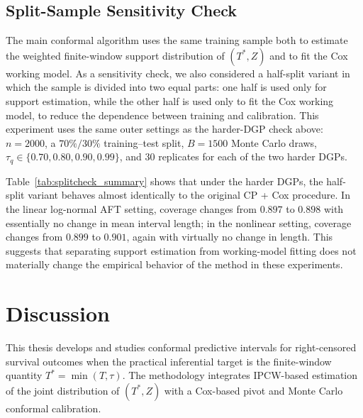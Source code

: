 \documentclass[12pt]{article}
\makeatletter
\let\thesis@chapter\section
\let\thesis@section\subsection
\let\thesis@subsection\subsubsection
\newcommand{\chapter}{\thesis@chapter}
\renewcommand{\section}{\thesis@section}
\renewcommand{\subsection}{\thesis@subsection}
\makeatother
\begin{document}
\section{\texorpdfstring{\textcolor{revisionblue}{Split-Sample Sensitivity Check}}{Split-Sample Sensitivity Check}}
{\color{revisionblue}
The main conformal algorithm uses the same training sample both to estimate the weighted finite-window support distribution of $(T^*,Z)$ and to fit the Cox working model. As a sensitivity check, we also considered a half-split variant in which the sample is divided into two equal parts: one half is used only for support estimation, while the other half is used only to fit the Cox working model, to reduce the dependence between training and calibration. This experiment uses the same outer settings as the harder-DGP check above: $n=2000$, a $70\%/30\%$ training--test split, $B=1500$ Monte Carlo draws, $\tau_q\in\{0.70,0.80,0.90,0.99\}$, and $30$ replicates for each of the two harder DGPs.

\begin{table}[htbp]
\centering
\small
\caption{\textcolor{revisionblue}{Average coverage and mean interval length for the original CP + Cox method and the half-split variant, aggregated over $\tau$ within each harder DGP.}}
\label{tab:splitcheck_summary}
%
\end{table}

Table~\ref{tab:splitcheck_summary} shows that under the harder DGPs, the half-split variant behaves almost identically to the original CP + Cox procedure. In the linear log-normal AFT setting, coverage changes from $0.897$ to $0.898$ with essentially no change in mean interval length; in the nonlinear setting, coverage changes from $0.899$ to $0.901$, again with virtually no change in length. This suggests that separating support estimation from working-model fitting does not materially change the empirical behavior of the method in these experiments.
}



\chapter{Discussion}
This thesis develops and studies conformal predictive intervals for right-censored survival outcomes when the practical inferential target is the finite-window quantity $T^*=\min(T,\tau)$.
The methodology integrates IPCW-based estimation of the joint distribution of $(T^*,Z)$ with a Cox-based pivot and Monte Carlo conformal calibration.
\end{document}
